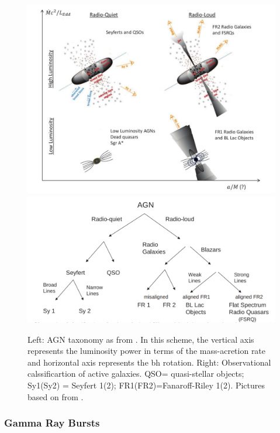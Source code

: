 \documentclass[main.tex]{subfiles}
\begin{document}
\begin{figure}
  \centering
  \includegraphics[width=\textwidth]{Pictures/schemeAGN.pdf}
  \includegraphics[width=\textwidth]{Pictures/AGNclassification.pdf}
  \caption{Left: AGN taxonomy as from \cite{2016AGNsingammarays}. In this scheme, the vertical axis represents the luminosity power in terms of the mass-acretion rate and horizontal axis represents the \gls{bh} rotation. Right: Observational calssificartion of active galaxies. QSO= quasi-stellar objects; Sy1(Sy2) = Seyfert 1(2); FR1(FR2)=Fanaroff-Riley 1(2). Pictures based on \cite{1995AGNunifiedschemes} from \cite{2016AGNsingammarays}.} 
  \label{fig:schemeAGN}
\end{figure}

\subsubsection{Gamma Ray Bursts}
\end{document}
